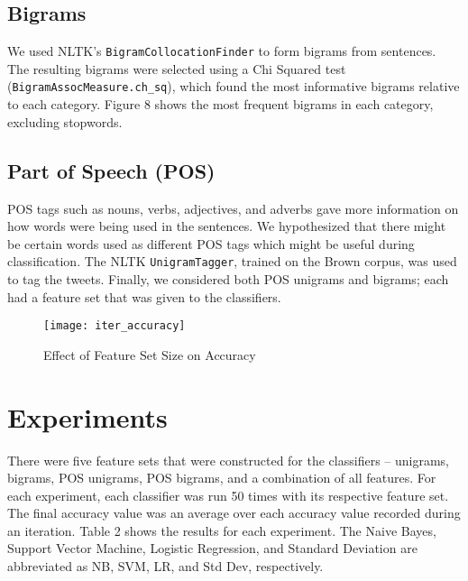 \documentclass[twocolumn]{article}
\begin{document}
\subsection{Bigrams}

We used NLTK's \texttt{BigramCollocationFinder} to form bigrams from sentences. The resulting bigrams were selected using a Chi Squared test (\texttt{BigramAssocMeasure.ch\_sq}), which found the most informative bigrams relative to each category. Figure 8 shows the most frequent bigrams in each category, excluding stopwords.

\subsection{Part of Speech (POS)}

POS tags such as nouns, verbs, adjectives, and adverbs gave more information on how words were being used in the sentences. We hypothesized that there might be certain words used as different POS tags which might be useful during classification. The NLTK \texttt{UnigramTagger}, trained on the Brown corpus, was used to tag the tweets. Finally, we considered both POS unigrams and bigrams; each had a feature set that was given to the classifiers.

\begin{figure}
    \centering
    \texttt{[image: iter\_accuracy]}
    \caption{Effect of Feature Set Size on Accuracy}
\end{figure}

\section{Experiments}

There were five feature sets that were constructed for the classifiers -- unigrams, bigrams, POS unigrams, POS bigrams, and a combination of all features. For each experiment, each classifier was run 50 times with its respective feature set. The final accuracy value was an average over each accuracy value recorded during an iteration. Table 2 shows the results for each experiment. The Naive Bayes, Support Vector Machine, Logistic Regression, and Standard Deviation are abbreviated as NB, SVM, LR, and Std Dev, respectively.
\end{document}
